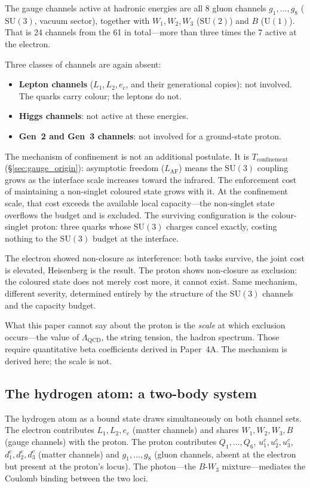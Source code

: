 \documentclass[11pt]{article}
\newenvironment{varlist}{\begin{itemize}[nosep,leftmargin=2em]}{\end{itemize}}
\newcommand{\SU}{\mathrm{SU}}
\newcommand{\U}{\mathrm{U}}
\begin{document}
The gauge channels active at hadronic energies are all 8 gluon channels
$g_1,\ldots,g_8$ ($\SU(3)$, vacuum sector), together with $W_1, W_2,
W_3$ ($\SU(2)$) and $B$ ($\U(1)$).  That is 24 channels from the 61 in
total---more than three times the 7 active at the electron.

Three classes of channels are again absent:
\begin{varlist}
\item \textbf{Lepton channels} ($L_1, L_2, e_c$, and their generational
copies): not involved.  The quarks carry colour; the leptons do not.
\item \textbf{Higgs channels}: not active at these energies.
\item \textbf{Gen~2 and Gen~3 channels}: not involved for a
ground-state proton.
\end{varlist}

The mechanism of confinement is not an additional postulate.  It is
$T_{\mathrm{confinement}}$ (\S\ref{sec:gauge_origin}): asymptotic freedom
($L_{\mathrm{AF}}$) means the $\SU(3)$ coupling grows as the interface
scale increases toward the infrared.  The enforcement cost of maintaining
a non-singlet coloured state grows with it.  At the confinement scale, that
cost exceeds the available local capacity---the non-singlet state overflows
the budget and is excluded.  The surviving configuration is the
colour-singlet proton: three quarks whose $\SU(3)$ charges cancel exactly,
costing nothing to the $\SU(3)$ budget at the interface.

The electron showed non-closure as interference: both tasks survive, the
joint cost is elevated, Heisenberg is the result.  The proton shows
non-closure as exclusion: the coloured state does not merely cost more, it
cannot exist.  Same mechanism, different severity, determined entirely by
the structure of the $\SU(3)$ channels and the capacity budget.

What this paper cannot say about the proton is the \emph{scale} at which
exclusion occurs---the value of $\Lambda_{\mathrm{QCD}}$, the string
tension, the hadron spectrum.  Those require quantitative beta
coefficients derived in Paper~4A.  The mechanism is derived here; the
scale is not.

\subsection*{The hydrogen atom: a two-body system}

The hydrogen atom as a bound state draws simultaneously on both channel
sets.  The electron contributes $L_1, L_2, e_c$ (matter channels) and
shares $W_1, W_2, W_3, B$ (gauge channels) with the proton.  The proton
contributes $Q_1,\ldots,Q_6$, $u^c_1, u^c_2, u^c_3$, $d^c_1, d^c_2,
d^c_3$ (matter channels) and $g_1,\ldots,g_8$ (gluon channels, absent
at the electron but present at the proton's locus).  The photon---the
$B$-$W_3$ mixture---mediates the Coulomb binding between the two loci.
\end{document}
